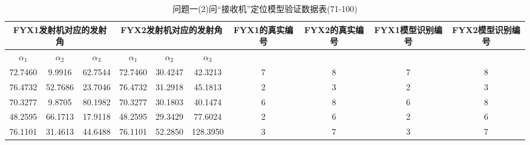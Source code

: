 \documentclass[withoutpreface,bwprint]{cumcmthesis} %
\begin{document}
\begin{appendices}
					\begin{table}[htbp!]
				\footnotesize
				\caption{问题一(2)问“接收机”定位模型验证数据表(71-100)}
				\centering
				\tabcolsep=0.1cm
				\begin{tabular}{@{}cccccccccc@{}}
					\toprule
					\multicolumn{3}{c}{\textbf{FYX1发射机对应的发射角}}                                                           & \multicolumn{3}{c}{\textbf{FYX2发射机对应的发射角}}                                                           & \textbf{FYX1的真实编号} & \textbf{FYX2的真实编号} & \textbf{FYX1模型识别编号} & \textbf{FYX2模型识别编号} \\ \midrule
					\multicolumn{1}{c|}{\textbf{$\alpha_{1}$}} & \multicolumn{1}{c|}{\textbf{$\alpha_{2}$}} & \multicolumn{1}{c|}{\textbf{$\alpha_{3}$}} & \multicolumn{1}{c|}{\textbf{$\alpha_{1}$}} & \multicolumn{1}{c|}{\textbf{$\alpha_{2}$}} & \multicolumn{1}{c|}{\textbf{$\alpha_{3}$}} & \multicolumn{4}{c}{\textbf{}}  
					\\ \midrule                                
						72.7460                          & 9.9916                           & 62.7544                          & 72.7460                          & 30.4247                          & 42.3213                          & 7                    & 8                    & 7                      & 8                      \\
						76.4732                          & 52.7686                          & 23.7046                          & 76.4732                          & 31.2918                          & 45.1813                          & 2                    & 3                    & 2                      & 3                      \\
						70.3277                          & 9.8705                           & 80.1982                          & 70.3277                          & 30.1803                          & 40.1474                          & 6                    & 8                    & 6                      & 8                      \\
						48.2595                          & 66.1713                          & 17.9118                          & 48.2595                          & 29.3429                          & 77.6024                          & 2                    & 6                    & 2                      & 6                      \\
						76.1101                          & 31.4613                          & 44.6488                          & 76.1101                          & 52.2850                          & 128.3950                         & 3                    & 7                    & 3                      & 7                      \\

\end{tabular}
\end{table}
\end{appendices}
\end{document}
